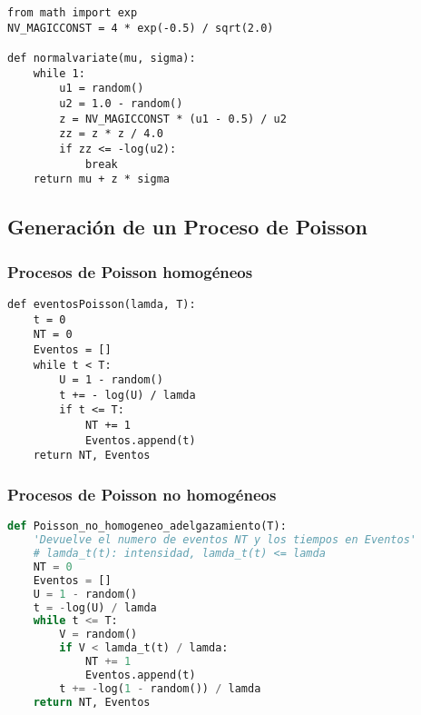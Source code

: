 \documentclass[11pt, a4paper]{article}
\theoremstyle{definition}
\begin{document}
\begin{lstlisting}
from math import exp
NV_MAGICCONST = 4 * exp(-0.5) / sqrt(2.0)

def normalvariate(mu, sigma):
    while 1:
        u1 = random()
        u2 = 1.0 - random()
        z = NV_MAGICCONST * (u1 - 0.5) / u2
        zz = z * z / 4.0
        if zz <= -log(u2):
            break
    return mu + z * sigma
\end{lstlisting}

\subsection{Generación de un Proceso de Poisson}

\subsubsection{Procesos de Poisson homogéneos}
\begin{lstlisting}
def eventosPoisson(lamda, T):
    t = 0
    NT = 0
    Eventos = []
    while t < T:
        U = 1 - random()
        t += - log(U) / lamda
        if t <= T:
            NT += 1
            Eventos.append(t)
    return NT, Eventos
\end{lstlisting}

\subsubsection{Procesos de Poisson no homogéneos}

\begin{lstlisting}[language=Python]
def Poisson_no_homogeneo_adelgazamiento(T):
    'Devuelve el numero de eventos NT y los tiempos en Eventos'
    # lamda_t(t): intensidad, lamda_t(t) <= lamda
    NT = 0
    Eventos = []
    U = 1 - random()
    t = -log(U) / lamda
    while t <= T:
        V = random()
        if V < lamda_t(t) / lamda:
            NT += 1
            Eventos.append(t)
        t += -log(1 - random()) / lamda
    return NT, Eventos
\end{lstlisting}
\end{document}
